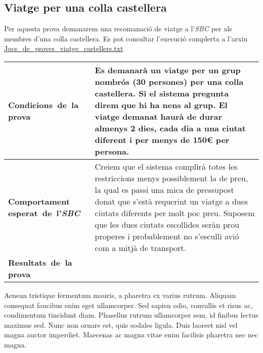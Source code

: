 \documentclass[11pt,a4paper]{article}
\begin{document}
\subsection{Viatge per una colla castellera}
Per aquesta prova demanarem una recomanació de viatge a l'\emph{SBC} per als membres d'una colla castellera. Es pot consultar l'execució complerta a l'arxiu \url{Jocs_de_proves_viatge_castellers.txt} \\

\noindent
\begin{tabular}{|p{}|p{}|}
\hline
\textbf{\mbox{Condicions de la} \mbox{prova}} & Es demanarà un viatge per un grup nombrós (30 persones) per una colla castellera. Si el sistema pregunta direm que hi ha nens al grup. El viatge demanat haurà de durar almenys 2 dies, cada dia a una ciutat diferent i per menys de 150\euro{} per persona.\\
\hline
\textbf{Comportament \mbox{esperat de l'\emph{SBC}}} & Creiem que el sistema complirà totes les restriccions menys possiblement la de preu, la qual es passi una mica de pressupost donat que s'està requerint un viatge a dues ciutats diferents per molt poc preu. Suposem que les dues ciutats escollides seràn prou properes i probablement no s'esculli avió com a mitjà de transport. \\
\hline
\textbf{\mbox{Resultats de la} \mbox{prova}} & \\
\hline
\end{tabular}
\medskip

Aenean tristique fermentum mauris, a pharetra ex varius rutrum. Aliquam consequat faucibus enim eget ullamcorper. Sed sapien odio, convallis et risus ac, condimentum tincidunt diam. Phasellus rutrum ullamcorper sem, id finibus lectus maximus sed. Nunc non ornare est, quis sodales ligula. Duis laoreet nisl vel magna auctor imperdiet. Maecenas ac magna vitae enim facilisis pharetra nec nec magna.
\end{document}
